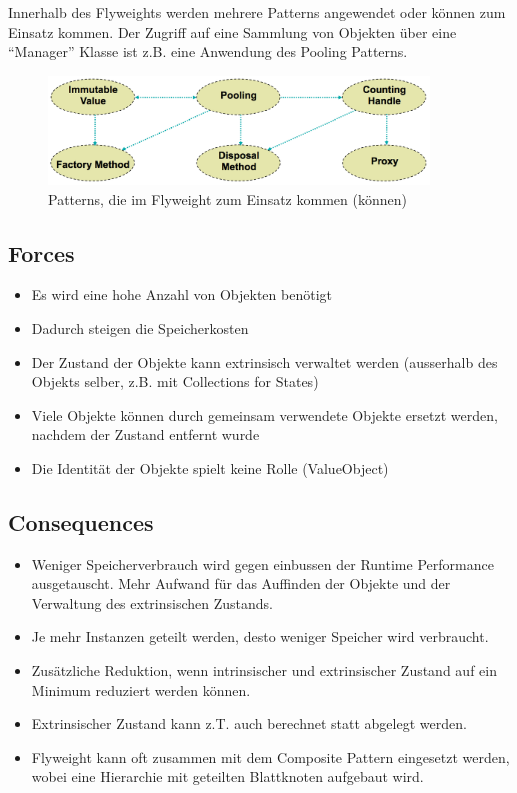 Innerhalb des Flyweights werden mehrere Patterns angewendet oder können zum Einsatz kommen. Der Zugriff auf eine Sammlung von Objekten über eine ``Manager'' Klasse ist z.B. eine Anwendung des Pooling Patterns.

\begin{figure}[H]
	\centering
	\includegraphics[width=0.9\textwidth]{content/gof/images/09-flyweight-subpatterns.png}
	\caption{Patterns, die im Flyweight zum Einsatz kommen (können)}
\end{figure}

\subsection*{Forces}

\begin{itemize}
	\item Es wird eine hohe Anzahl von Objekten benötigt
	\item Dadurch steigen die Speicherkosten
	\item Der Zustand der Objekte kann extrinsisch verwaltet werden (ausserhalb des Objekts selber, z.B. mit Collections for States)
	\item Viele Objekte können durch gemeinsam verwendete Objekte ersetzt werden, nachdem der Zustand entfernt wurde
	\item Die Identität der Objekte spielt keine Rolle (ValueObject)
\end{itemize}

\subsection*{Consequences}

\begin{itemize}
	\item Weniger Speicherverbrauch wird gegen einbussen der Runtime Performance ausgetauscht. Mehr Aufwand für das Auffinden der Objekte und der Verwaltung des extrinsischen Zustands.
	\item Je mehr Instanzen geteilt werden, desto weniger Speicher wird verbraucht.
	\item Zusätzliche Reduktion, wenn intrinsischer und extrinsischer Zustand auf ein Minimum reduziert werden können.
	\item Extrinsischer Zustand kann z.T. auch berechnet statt abgelegt werden.
	\item Flyweight kann oft zusammen mit dem Composite Pattern eingesetzt werden, wobei eine Hierarchie mit geteilten Blattknoten aufgebaut wird.
\end{itemize}

